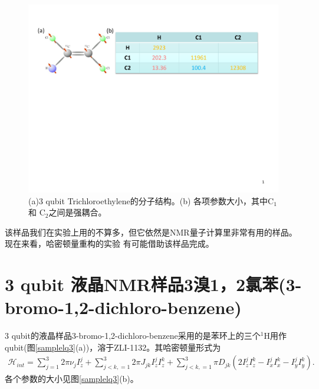 \begin{figure}[htbp]
            \begin{center}
              \includegraphics[width= 0.8\columnwidth]{figures/sampleTCE.pdf}
              \caption{(a)3 qubit Trichloroethylene的分子结构。(b) 各项参数大小，其中C$_1$和 C$_2$之间是强耦合。}
              \label{sampleTCE}
            \end{center}
\end{figure}

该样品我们在实验上用的不算多，但它依然是NMR量子计算里非常有用的样品。现在来看，哈密顿量重构\cite{app23}的实验
有可能借助该样品完成。

\section{3 qubit 液晶NMR样品3溴1，2氯苯(3-bromo-1,2-dichloro-benzene)}

3 qubit的液晶样品3-bromo-1,2-dichloro-benzene采用的是苯环上的三个$^{1}$H用作qubit(图\ref{samplelq3}(a))，溶于ZLI-1132。其哈密顿量形式为
\begin{eqnarray}
\mathcal{H}_{int}=\sum\limits_{j=1}^3 {2\pi \nu _j } I_z^j  + \sum\limits_{j < k,=1}^3 {2\pi} J_{jk} I_z^j I_z^k+\sum\limits_{j < k,=1}^3 {\pi} D_{jk}(2I_z^jI_z^k-I_x^jI_x^k-I_y^jI_y^k).
\end{eqnarray}
各个参数的大小见图\ref{samplelq3}(b)。

